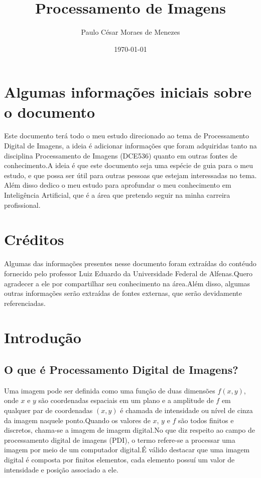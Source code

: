 \documentclass[12pt]{article}
\title{Processamento de Imagens}
\author{Paulo César Moraes de Menezes}
\date{\today}
\begin{document}
\maketitle

\newpage

\tableofcontents %

\newpage

\section{Algumas informações iniciais sobre o documento}

Este documento terá todo o meu estudo direcionado ao tema de Processamento Digital de Imagens, a ideia é adicionar informações que foram
adquiridas tanto na disciplina Processamento de Imagens (DCE536) quanto em outras fontes de conhecimento.A ideia é que este documento seja
uma espécie de guia para o meu estudo, e que possa ser útil para outras pessoas que estejam interessadas no tema.
Além disso dedico o meu estudo para aprofundar o meu conhecimento em Inteligência Artificial, que é a área que pretendo seguir na minha
carreira profissional.

\section{Créditos}

Algumas das informações presentes nesse documento foram extraídas do contéudo fornecido pelo professor Luiz Eduardo da Universidade Federal de
Alfenas.Quero agradecer a ele por compartilhar seu conhecimento na área.Além disso, algumas outras informações serão extraídas de fontes
externas, que serão devidamente referenciadas.

\section{Introdução}



\subsection{O que é Processamento Digital de Imagens?}

Uma imagem pode ser definida como uma função de duas dimensões $f(x,y)$, onde $x$ e $y$ são coordenadas
espaciais em um plano e a amplitude de $f$ em qualquer par de coordenadas $(x,y)$ é chamada de intensidade
ou nível de cinza da imagem naquele ponto.Quando os valores de $x$, $y$ e $f$ são todos finitos e
discretos, chama-se a imagem de imagem digital.No que diz respeito ao campo de processamento digital
de imagens (PDI), o termo refere-se a processar uma imagem por meio de um computador digital.É válido
destacar que uma imagem digital é composta por finitos elementos, cada elemento possuí um valor de
intensidade e posição associado a ele.
\end{document}
